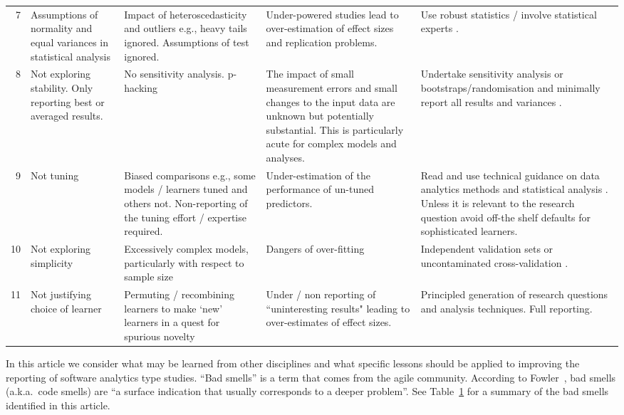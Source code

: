\documentclass[preprint,10pt]{elsarticle}
\begin{document}
\begin{table}
\begin{center}
\begin{tabular}{|r|p{1.7cm}|p{2.3cm}|p{2.5cm}|p{3cm}|}
7  & Assumptions of normality and equal variances in statistical analysis & Impact of heteroscedasticity and outliers e.g., heavy tails ignored.  Assumptions of test ignored.  & Under-powered studies lead to over-estimation of effect sizes and replication problems. & Use robust statistics / involve statistical experts \cite{Kitc02,Wilc12}.\\
\rowcolor{gray!50}8 & Not exploring stability.  Only reporting best or averaged results. & No sensitivity analysis. p-hacking & The impact of small measurement errors and small changes to the input data are unknown but potentially substantial.  This is particularly acute for complex models and analyses. & Undertake sensitivity analysis or bootstraps/randomisation and minimally report all results and variances \cite{Manl97,Salt00}.\\
9 & Not tuning & Biased comparisons e.g., some models / learners tuned and others not. Non-reporting of the tuning effort / expertise required. & Under-estimation of the performance of un-tuned predictors. & Read and use technical guidance on data analytics methods and statistical analysis \cite{Snoe12,fu2016}.  Unless it is relevant to the research question avoid off-the shelf defaults for sophisticated learners.\\
\rowcolor{gray!50} 10 & Not exploring simplicity & Excessively complex models, particularly with respect to sample size  & Dangers of over-fitting & Independent validation sets or uncontaminated cross-validation \cite{Cawl10}. \\
11 & Not justifying choice of learner & Permuting / recombining learners to make `new' learners in a quest for spurious novelty & Under / non reporting of ``uninteresting results" leading to over-estimates of effect sizes. & Principled generation of research questions and analysis techniques. Full reporting. \\
\hline
\end{tabular}
\end{center}
\label{Tab:BadSmells}
\end{table}%

In this article we consider what may be learned from other disciplines and what specific lessons should be applied to improving the reporting of software analytics type studies.  ``Bad smells'' is a term that comes from the agile community. According to Fowler~\cite{beck1999bad}, bad smells (a.k.a.\ code smells) are ``a surface indication that usually corresponds to a deeper problem''.  See Table~\ref{Tab:BadSmells} for a summary of the bad smells identified in this article.
\end{document}
